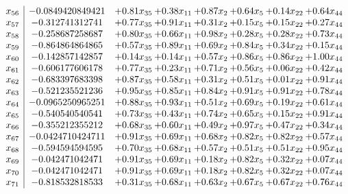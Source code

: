 \documentclass[8pt]{article}
\begin{document}
\[\begin{array}{c| c c@{\hskip 2pt} c@{\hskip 2pt} c@{\hskip 2pt} c@{\hskip 2pt} c@{\hskip 2pt} c@{\hskip 2pt} }
 x_{56}   &  -0.0849420849421 & +  0.81 x_{35} & +  0.38 x_{11} & +  0.87 x_{2} & +  0.64 x_{5} & +  0.14 x_{22} & +  0.64 x_{44}\\
 x_{57}   &  -0.312741312741 & +  0.77 x_{35} & +  0.91 x_{11} & +  0.31 x_{2} & +  0.15 x_{5} & +  0.15 x_{22} & +  0.27 x_{44}\\
 x_{58}   &  -0.258687258687 & +  0.80 x_{35} & +  0.66 x_{11} & +  0.98 x_{2} & +  0.28 x_{5} & +  0.28 x_{22} & +  0.73 x_{44}\\
 x_{59}   &  -0.864864864865 & +  0.57 x_{35} & +  0.89 x_{11} & +  0.69 x_{2} & +  0.84 x_{5} & +  0.34 x_{22} & +  0.15 x_{44}\\
 x_{60}   &  -0.142857142857 & +  0.14 x_{35} & +  0.14 x_{11} & +  0.57 x_{2} & +  0.86 x_{5} & +  0.86 x_{22} & +  1.00 x_{44}\\
 x_{61}   &  -0.606177606178 & +  0.77 x_{35} & +  0.23 x_{11} & +  0.71 x_{2} & +  0.56 x_{5} & +  0.06 x_{22} & +  0.42 x_{44}\\
 x_{62}   &  -0.683397683398 & +  0.87 x_{35} & +  0.58 x_{11} & +  0.31 x_{2} & +  0.51 x_{5} & +  0.01 x_{22} & +  0.91 x_{44}\\
 x_{63}   &  -0.521235521236 & +  0.95 x_{35} & +  0.85 x_{11} & +  0.84 x_{2} & +  0.91 x_{5} & +  0.91 x_{22} & +  0.78 x_{44}\\
 x_{64}   &  -0.0965250965251 & +  0.88 x_{35} & +  0.93 x_{11} & +  0.51 x_{2} & +  0.69 x_{5} & +  0.19 x_{22} & +  0.61 x_{44}\\
 x_{65}   &  -0.540540540541 & +  0.73 x_{35} & +  0.43 x_{11} & +  0.74 x_{2} & +  0.65 x_{5} & +  0.15 x_{22} & +  0.91 x_{44}\\
 x_{66}   &  -0.355212355212 & +  0.68 x_{35} & +  0.60 x_{11} & +  0.49 x_{2} & +  0.97 x_{5} & +  0.47 x_{22} & +  0.34 x_{44}\\
 x_{67}   &  -0.0424710424711 & +  0.91 x_{35} & +  0.69 x_{11} & +  0.68 x_{2} & +  0.82 x_{5} & +  0.82 x_{22} & +  0.57 x_{44}\\
 x_{68}   &  -0.594594594595 & +  0.70 x_{35} & +  0.68 x_{11} & +  0.57 x_{2} & +  0.51 x_{5} & +  0.51 x_{22} & +  0.95 x_{44}\\
 x_{69}   &  -0.042471042471 & +  0.91 x_{35} & +  0.69 x_{11} & +  0.18 x_{2} & +  0.82 x_{5} & +  0.32 x_{22} & +  0.07 x_{44}\\
 x_{70}   &  -0.042471042471 & +  0.91 x_{35} & +  0.69 x_{11} & +  0.18 x_{2} & +  0.82 x_{5} & +  0.32 x_{22} & +  0.07 x_{44}\\
 x_{71}   &  -0.818532818533 & +  0.31 x_{35} & +  0.68 x_{11} & +  0.63 x_{2} & +  0.67 x_{5} & +  0.67 x_{22} & +  0.76 x_{44}\\

\end{array}\]
\end{document}
